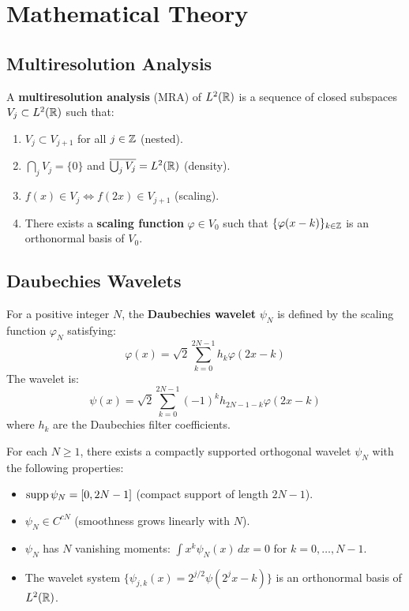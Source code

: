 \section{Mathematical Theory}

\subsection{Multiresolution Analysis}

\begin{definition}
A \textbf{multiresolution analysis} (MRA) of $L^2(\mathbb{R})$ is a sequence of closed subspaces $V_j \subset L^2(\mathbb{R})$ such that:
\begin{enumerate}
    \item $V_j \subset V_{j+1}$ for all $j \in \mathbb{Z}$ (nested).
    \item $\bigcap_j V_j = \{0\}$ and $\overline{\bigcup_j V_j} = L^2(\mathbb{R})$ (density).
    \item $f(x) \in V_j \iff f(2x) \in V_{j+1}$ (scaling).
    \item There exists a \textbf{scaling function} $\varphi \in V_0$ such that $\{\varphi(x - k)\}_{k \in \mathbb{Z}}$ is an orthonormal basis of $V_0$.
\end{enumerate}
\end{definition}

\subsection{Daubechies Wavelets}

\begin{definition}
For a positive integer $N$, the \textbf{Daubechies wavelet} $\psi_N$ is defined by the scaling function $\varphi_N$ satisfying:
\[
\varphi(x) = \sqrt{2} \sum_{k=0}^{2N-1} h_k \varphi(2x - k)
\]
The wavelet is:
\[
\psi(x) = \sqrt{2} \sum_{k=0}^{2N-1} (-1)^k h_{2N-1-k} \varphi(2x - k)
\]
where $h_k$ are the Daubechies filter coefficients.
\end{definition}

\begin{theorem}[Daubechies, 1988]
For each $N \geq 1$, there exists a compactly supported orthogonal wavelet $\psi_N$ with the following properties:
\begin{itemize}
    \item $\operatorname{supp} \psi_N = [0, 2N-1]$ (compact support of length $2N-1$).
    \item $\psi_N \in C^{cN}$ (smoothness grows linearly with $N$).
    \item $\psi_N$ has $N$ vanishing moments: $\int x^k \psi_N(x) \, dx = 0$ for $k = 0, \ldots, N-1$.
    \item The wavelet system $\{\psi_{j,k}(x) = 2^{j/2} \psi(2^j x - k)\}$ is an orthonormal basis of $L^2(\mathbb{R})$.
\end{itemize}
\end{theorem}

